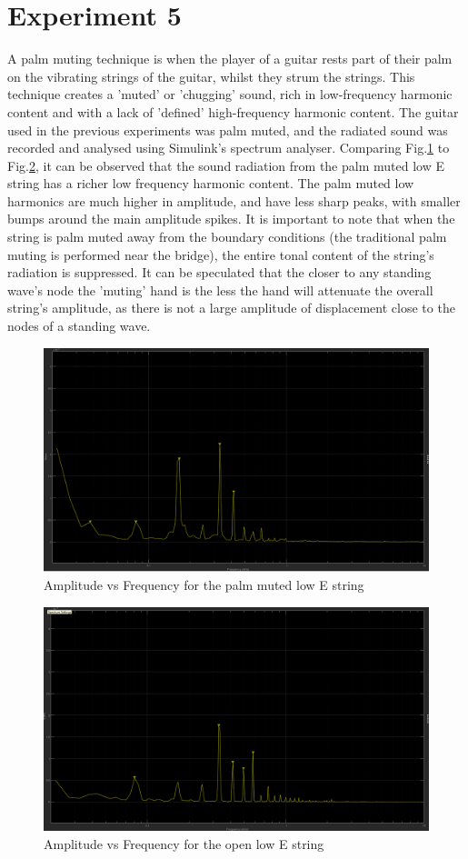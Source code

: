 \documentclass[11pt]{article}
\begin{document}
    \section{Experiment 5} 
        A palm muting technique is when the player of a guitar rests part of their palm on the vibrating strings of the guitar, whilst they strum the strings.
        This technique creates a 'muted' or 'chugging' sound, rich in low-frequency harmonic content and with a lack of 'defined' high-frequency harmonic content.
        The guitar used in the previous experiments was palm muted, and the radiated sound was recorded and analysed using Simulink's spectrum analyser.
        Comparing Fig.\ref{Epm} to Fig.\ref{Eopen}, it can be observed that the sound radiation from the palm muted low E string has a richer low frequency harmonic content.
        The palm muted low harmonics are much higher in amplitude, and have less sharp peaks, with smaller bumps around the main amplitude spikes.
        It is important to note that when the string is palm muted away from the boundary conditions (the traditional palm muting is performed near the bridge), the entire tonal content of the string's radiation is suppressed.
        It can be speculated that the closer to any standing wave's node the 'muting' hand is the less the hand will attenuate the overall string's amplitude, as there is not a large amplitude of displacement close to the nodes of a standing wave.
        \begin{figure}[H]\label{Epm}
            \centering
            \includegraphics[scale=0.3]{resources/Epm.png}
            \caption{Amplitude vs Frequency for the palm muted low E string}
        \end{figure}
        \begin{figure}[H]\label{Eopen}
            \centering
            \includegraphics[scale=0.3]{resources/Eopen.png}
            \caption{Amplitude vs Frequency for the open low E string}
        \end{figure}
        
        
        
\end{document}
